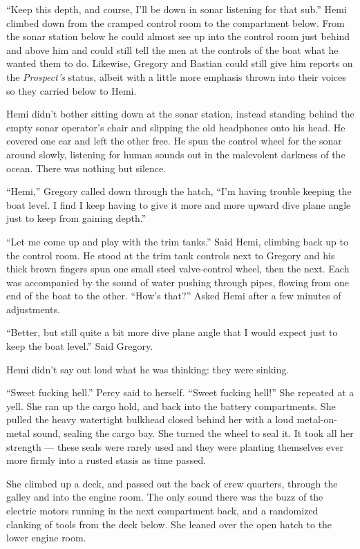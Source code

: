 \documentclass[]{article}
\begin{document}
``Keep this depth, and course, I'll be down in sonar listening for that
sub.'' Hemi climbed down from the cramped control room to the
compartment below. From the sonar station below he could almost see up
into the control room just behind and above him and could still tell the
men at the controls of the boat what he wanted them to do. Likewise,
Gregory and Bastian could still give him reports on the
\emph{Prospect's} status, albeit with a little more emphasis thrown into
their voices so they carried below to Hemi.

Hemi didn't bother sitting down at the sonar station, instead standing
behind the empty sonar operator's chair and slipping the old headphones
onto his head. He covered one ear and left the other free. He spun the
control wheel for the sonar around slowly, listening for human sounds
out in the malevolent darkness of the ocean. There was nothing but
silence.

``Hemi,'' Gregory called down through the hatch, ``I'm having trouble
keeping the boat level. I find I keep having to give it more and more
upward dive plane angle just to keep from gaining depth.''

``Let me come up and play with the trim tanks.'' Said Hemi, climbing
back up to the control room. He stood at the trim tank controls next to
Gregory and his thick brown fingers spun one small steel valve-control
wheel, then the next. Each was accompanied by the sound of water pushing
through pipes, flowing from one end of the boat to the other. ``How's
that?'' Asked Hemi after a few minutes of adjustments.

``Better, but still quite a bit more dive plane angle that I would
expect just to keep the boat level.'' Said Gregory.

Hemi didn't say out loud what he was thinking: they were sinking.

``Sweet fucking hell.'' Percy said to herself. ``Sweet fucking hell!''
She repeated at a yell. She ran up the cargo hold, and back into the
battery compartments. She pulled the heavy watertight bulkhead closed
behind her with a loud metal-on-metal sound, sealing the cargo bay. She
turned the wheel to seal it. It took all her strength --- these seals
were rarely used and they were planting themselves ever more firmly into
a rusted stasis as time passed.

She climbed up a deck, and passed out the back of crew quarters, through
the galley and into the engine room. The only sound there was the buzz
of the electric motors running in the next compartment back, and a
randomized clanking of tools from the deck below. She leaned over the
open hatch to the lower engine room.
\end{document}
